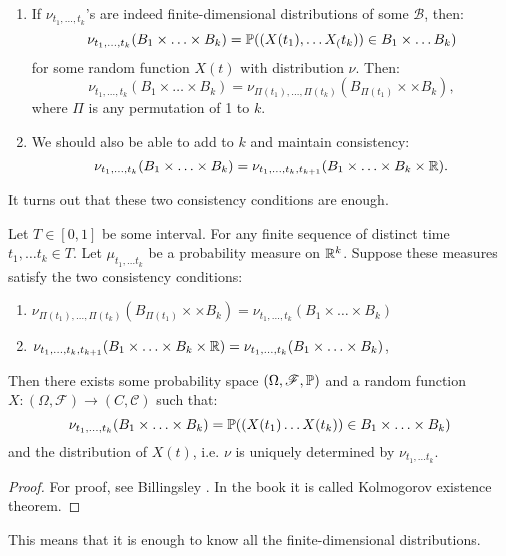 \documentclass[../main/main.tex]{subfiles}
\begin{document}
\begin{enumerate}
	\item
	      If $\nu_{t_1, \ldots ,t_k}$'s are indeed finite-dimensional distributions of some $\mathcal{B}$, then: \[
		      \nu_{t_1, \ldots ,t_k}(B_1 \times\ldots \times B_k) = \P ((X(t_1),\ldots X_(t_k)) \in B_1 \times \ldots B_k)
	      \] for some random function $X(t)$ with distribution $\nu$. Then: \[
		      \nu_{t_1, \ldots ,t_k}(B_1 \times \ldots\times B_k) = \nu_{\Pi(t_1), \ldots ,\Pi(t_k)}(B_{\Pi(t_1)} \times \times B_k) ,
	      \] where $\Pi$ is any permutation of 1 to $k$.
	\item We should also be able to add to $k$ and maintain consistency:\[
		      \nu_{t_1, \ldots ,t_k}(B_1 \times\ldots \times B_k) =  \nu_{t_1, \ldots ,t_k, t_{k+1}}(B_1 \times\ldots \times B_k \times \R).
	      \]
\end{enumerate}

It turns out that these two consistency conditions are enough.

\begin{theorem}
	Let $T \in [0,1]$ be some interval. For any finite sequence of distinct time $t_1, \ldots t_k \in T$. Let $\mu_{t_1, \ldots t_k}$ be a probability measure on $\R^{k}$. Suppose these measures satisfy the two consistency conditions:
	\begin{enumerate}
		\item $ \nu_{\Pi(t_1), \ldots ,\Pi(t_k)}(B_{\Pi(t_1)} \times \times B_k) =\nu_{t_1, \ldots ,t_k}(B_1 \times \ldots\times B_k) $
		\item $ \nu_{t_1, \ldots ,t_k, t_{k+1}}(B_1 \times\ldots \times B_k \times \R)=\nu_{t_1, \ldots ,t_k}(B_1 \times\ldots \times B_k)$,
	\end{enumerate}
	Then there exists some probability space $(\Omega, \mathscr{F}, \P)$ and a random function $X: (\Omega, \mathscr{F}) \to (C, \mathscr{C})$ such that: \[
		\nu_{t_1, \ldots ,t_k}(B_1 \times\ldots \times B_k) = \P((X(t_1)\ldots X(t_k)) \in B_1 \times \ldots \times B_k)
	\] and the distribution of $X(t)$, i.e. $\nu$ is uniquely determined by $\nu_{t_1, \ldots t_k}$.
\end{theorem}

\begin{proof}
	For proof, see Billingsley \cite{Bill86}. In the book it is called Kolmogorov existence theorem.
\end{proof}
This means that it is enough to know all the finite-dimensional distributions.
\end{document}
